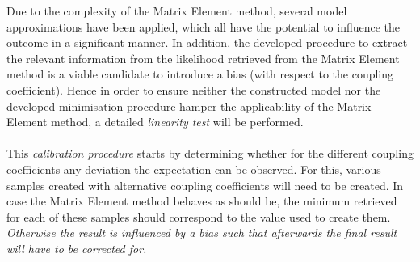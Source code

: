 Due to the complexity of the Matrix Element method, several model approximations have been applied, which all have the potential to influence the outcome in a significant manner. 
In addition, the developed procedure to extract the relevant information from the likelihood retrieved from the Matrix Element method is a viable candidate to introduce a bias (with respect to the coupling coefficient).
Hence in order to ensure neither the constructed model nor the developed minimisation procedure hamper the applicability of the Matrix Element method, a detailed \textit{linearity test} will be performed. 
\\
\\
This \textit{calibration procedure} starts by determining whether for the different coupling coefficients any deviation the expectation can be observed. For this, various samples created with alternative coupling coefficients will need to be created. In case the Matrix Element method behaves as should be, the minimum retrieved for each of these samples should correspond to the value used to create them. \textit{Otherwise the result is influenced by a bias such that afterwards the final result will have to be corrected for.}
\\

